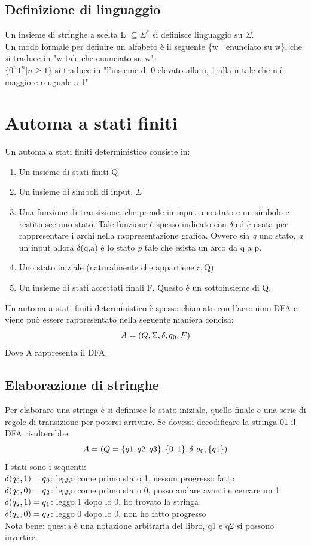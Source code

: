 \documentclass[12pt]{article}
\begin{document}
\subsection{Definizione di linguaggio}
Un insieme di stringhe a scelta L $\subseteq\Sigma^*$ si definisce linguaggio su $\Sigma$. 
\\ Un modo formale per definire un alfabeto è il seguente \{w $|$ enunciato su w\}, che si traduce in "w tale che enunciato su w".
\\ $\{0^n 1^n | n \ge 1 \}$ si traduce in "l’insieme di 0 elevato alla n, 1 alla n tale che n è maggiore o uguale a 1" 

\newpage
\section{Automa a stati finiti}
Un automa a stati finiti deterministico consiste in: 
\begin{enumerate}
  \item Un insieme di stati finiti Q
  \item Un insieme di simboli di input, $\Sigma$
  \item Una funzione di transizione, che prende in input uno stato e un simbolo e restituisce uno stato. Tale funzione è spesso indicato con $\delta$ ed è usata per rappresentare i archi nella rappresentazione grafica. Ovvero sia \emph{q} uno stato, \emph{a} un input allora $\delta$(q,a) è lo stato \emph{p} tale che esista un arco da q a p.
  \item Uno stato iniziale (naturalmente che appartiene a Q)
  \item Un insieme di stati accettati finali F. Questo è un sottoinsieme di Q.
\end{enumerate}
Un automa a stati finiti deterministico è spesso chiamato con l'acronimo DFA e viene può essere rappresentato nella seguente maniera concisa: 
\[A = (Q, \Sigma, \delta, q\textsubscript{0}, F)\]
Dove A rappresenta il DFA.

\subsection{ Elaborazione di stringhe }
Per elaborare una stringa è si definisce lo stato iniziale, quello finale e una serie di regole di transizione per poterci arrivare. 
Se dovessi decodificare la stringa 01 il DFA risulterebbe: 
\[A = (Q=\{q1,q2,q3\}, \{0,1\}, \delta, q\textsubscript{0}, \{q1\})\]
I stati sono i sequenti: 
\\ $\delta(q\textsubscript{0},1)=q\textsubscript{0}$: leggo come primo stato 1, nessun progresso fatto
\\ $\delta(q\textsubscript{0},0)=q\textsubscript{2}$: leggo come primo stato 0, posso andare avanti e cercare un 1
\\ $\delta(q\textsubscript{2},1)=q\textsubscript{1}$: leggo 1 dopo lo 0, ho trovato la stringa
\\ $\delta(q\textsubscript{2},0)=q\textsubscript{2}$: leggo 0 dopo lo 0, non ho fatto progresso
\\ Nota bene: questa è una notazione arbitraria del libro, q1 e q2 si possono invertire.
\end{document}
